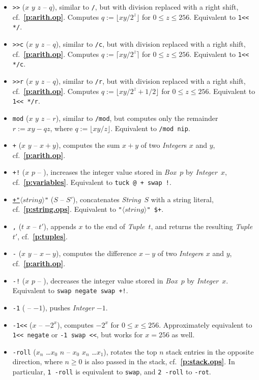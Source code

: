 \documentclass[12pt,oneside]{article}
\def\refpoint#1{{\rm\textbf{\ref{#1}}}}
\let\ptref=\refpoint
\begin{document}
\begin{itemize}
\item {\tt *>{}>} ($x$ $y$ $z$ -- $q$), similar to {\tt */}, but with division replaced with a right shift, cf.~\ptref{p:arith.op}. Computes $q:=\lfloor xy/2^z\rfloor$ for $0\leq z\leq 256$. Equivalent to {\tt 1<{}< */}.
\item {\tt *>{}>c} ($x$ $y$ $z$ -- $q$), similar to {\tt */c}, but with division replaced with a right shift, cf.~\ptref{p:arith.op}. Computes $q:=\lceil xy/2^z\rceil$ for $0\leq z\leq 256$. Equivalent to {\tt 1<{}< */c}.
\item {\tt *>{}>r} ($x$ $y$ $z$ -- $q$), similar to {\tt */r}, but with division replaced with a right shift, cf.~\ptref{p:arith.op}. Computes $q:=\lfloor xy/2^z+1/2\rfloor$ for $0\leq z\leq 256$. Equivalent to {\tt 1<{}< */r}.
\item {\tt *mod} ($x$ $y$ $z$ -- $r$), similar to {\tt */mod}, but computes only the remainder $r:=xy-qz$, where $q:=\lfloor xy/z\rfloor$. Equivalent to {\tt */mod nip}.
\item {\tt +} ($x$ $y$ -- $x+y$), computes the sum $x+y$ of two {\em Integer\/}s $x$ and $y$, cf.~\ptref{p:arith.op}.
\item {\tt +!} ($x$ $p$ -- ), increases the integer value stored in {\em Box\/}~$p$ by {\em Integer\/}~$x$, cf.~\ptref{p:variables}. Equivalent to {\tt tuck @ + swap !}.
\item {\tt\underline{+"}$\langle\textit{string}\rangle$"} ($S$ -- $S'$), concatenates {\em String\/}~$S$ with a string literal, cf.~\ptref{p:string.ops}. Equivalent to {\tt "$\langle\textit{string}\rangle$" \$+}.
\item {\tt ,} ($t$ $x$ -- $t'$), appends $x$ to the end of {\em Tuple\/}~$t$, and returns the resulting {\em Tuple\/}~$t'$, cf.~\ptref{p:tuples}.
\item {\tt -} ($x$ $y$ -- $x-y$), computes the difference $x-y$ of two {\em Integer\/}s $x$ and $y$, cf.~\ptref{p:arith.op}.
\item {\tt -!} ($x$ $p$ -- ), decreases the integer value stored in {\em Box\/}~$p$ by {\em Integer\/}~$x$. Equivalent to {\tt swap negate swap +!}.
\item {\tt -1} ( -- $-1$), pushes {\em Integer\/} $-1$.
\item {\tt -1<{}<} ($x$ -- $-2^x$), computes $-2^x$ for $0\leq x\leq 256$. Approximately equivalent to {\tt 1<{}< negate} or {\tt -1 swap <{}<}, but works for $x=256$ as well.
\item {\tt -roll} ($x_n$ \dots $x_0$ $n$ -- $x_0$ $x_n$ \dots $x_1$), rotates the top $n$ stack entries in the opposite direction, where $n\geq0$ is also passed in the stack, cf.~\ptref{p:stack.ops}. In particular, {\tt 1 -roll} is equivalent to {\tt swap}, and {\tt 2 -roll} to {\tt -rot}.

\end{itemize}
\end{document}
